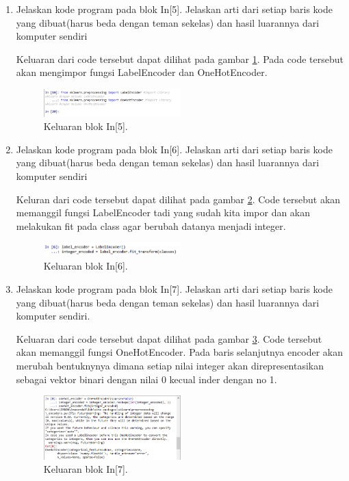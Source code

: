 \begin{enumerate}
\item Jelaskan kode program pada blok In[5]. Jelaskan arti dari setiap baris kode yang dibuat(harus beda dengan teman sekelas) dan hasil luarannya dari komputer sendiri \par

Keluaran dari code tersebut dapat dilihat pada gambar \ref{math5}. Pada code tersebut akan mengimpor fungsi LabelEncoder dan OneHotEncoder.
		\begin{figure}[!htbp]
		\centerline{\includegraphics[width=0.5\textwidth]{figures/im/math5.png}}
		\caption{Keluaran blok In[5].}
		\label{math5}
		\end{figure}

\item Jelaskan kode program pada blok In[6]. Jelaskan arti dari setiap baris kode yang dibuat(harus beda dengan teman sekelas) dan hasil luarannya dari komputer sendiri \par

Keluran dari code tersebut dapat dilihat pada gambar \ref{math6}. Code tersebut akan memanggil fungsi LabelEncoder tadi yang sudah kita impor dan akan melakukan fit pada class agar berubah datanya menjadi integer.
		\begin{figure}[!htbp]
		\centerline{\includegraphics[width=0.5\textwidth]{figures/im/math6.png}}
		\caption{Keluaran blok In[6].}
		\label{math6}
		\end{figure}

\item Jelaskan kode program pada blok In[7]. Jelaskan arti dari setiap baris kode yang dibuat(harus beda dengan teman sekelas) dan hasil luarannya dari komputer sendiri. \par

Keluaran dari code tersebut dapat dilihat pada gambar \ref{math7}. Code tersebut akan memanggil  fungsi OneHotEncoder. Pada baris selanjutnya encoder akan merubah bentuknynya dimana setiap nilai integer akan direpresentasikan sebagai vektor binari dengan nilai 0 kecual inder dengan no 1.
		\begin{figure}[!htbp]
		\centerline{\includegraphics[width=0.5\textwidth]{figures/im/math7.png}}
		\caption{Keluaran blok In[7].}
		\label{math7}
		\end{figure}


\end{enumerate}
